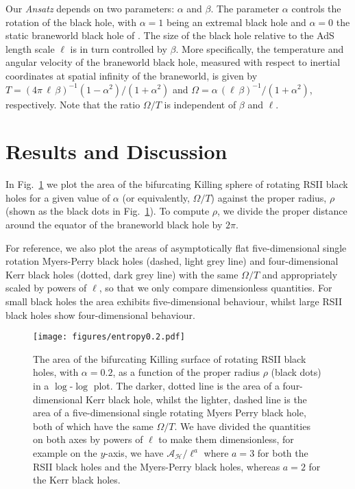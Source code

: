 \documentclass[%
 reprint,
 amsmath,amssymb,
 aps,
]{revtex4-2}
\begin{document}
Our \emph{Ansatz} depends on two parameters: $\alpha$ and $\beta$. The parameter $\alpha$ controls the rotation of the black hole, with $\alpha=1$ being an extremal black hole and $\alpha=0$ the static braneworld black hole of \cite{Figueras:2011gd}. The size of the black hole relative to the AdS length scale $\ell$ is in turn controlled by $\beta$. More specifically, the temperature and angular velocity of the braneworld black hole, measured with respect to inertial coordinates at spatial infinity of the braneworld, is given by $T=(4\pi\, \ell\, \beta)^{-1}(1-\alpha^2)/(1+\alpha^2)$ and $\Omega = \alpha\, (\ell\,\beta)^{-1}/(1+\alpha^2)$, respectively. Note that the ratio $\Omega/T$ is independent of $\beta$ and $\ell$.
\section{Results and Discussion}\label{Results}

In Fig.~\ref{fig:entropy} we plot the area of the bifurcating Killing sphere of rotating RSII black holes for a given value of $\alpha$ (or equivalently, $\Omega/T$) against the proper radius, $\rho$ (shown as the black dots in Fig.~\ref{fig:entropy}). To compute $\rho$, we divide the proper distance around the equator of the braneworld black hole by $2\pi$.

For reference, we also plot the areas of asymptotically flat five-dimensional single rotation Myers-Perry black holes (dashed, light grey line) and four-dimensional Kerr black holes (dotted, dark grey line) with the same $\Omega/T$ and appropriately scaled by powers of $\ell$, so that we only compare dimensionless quantities. For small black holes the area exhibits five-dimensional behaviour, whilst large RSII black holes show four-dimensional behaviour.

\begin{figure}[h]
\texttt{[image: figures/entropy0.2.pdf]}
\caption{\label{fig:entropy} The area of the bifurcating Killing surface of rotating RSII black holes, with $\alpha = 0.2$, as a function of the proper radius $\rho$ (black dots) in a $\log\text{-}\log$ plot. The darker, dotted line is the area of a four-dimensional Kerr black hole, whilst the lighter, dashed line is the area of a five-dimensional single rotating Myers Perry black hole,  both of which have the same $\Omega/T$. We have divided the quantities on both axes by powers of $\ell$ to make them dimensionless, for example on the $y$-axis, we have $\mathcal{A}_\mathcal{H}/\mathcal{\ell}^a$ where $a=3$ for both the RSII black holes and the Myers-Perry black holes, whereas $a=2$ for the Kerr black holes.}
\end{figure}
\end{document}
